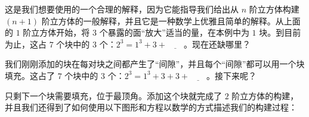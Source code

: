 这是我们想要使用的一个合理的解释，因为它能指导我们给出从 $n$ 阶立方体构建 $(n+1)$ 阶立方体的一般解释，并且它是一种数学上优雅且简单的解释。从上面的 $1$ 阶立方体开始，将 $3$ 个暴露的面``放大''适当的量，在本例中为 $1$ 块。到目前为止，这占 $7$ 个块中的 $3$ 个：$2^3 = 1^3+3+\underline{\qquad}$。现在还缺哪里？

\begin{center}
\end{center}

我们刚刚添加的块在每对块之间都产生了``间隙''，并且每个``间隙''都可以用一个块填充。这占了 $7$ 个块中的 $3$ 个：$2^3 = 1^3+3+3+\underline{\qquad}$。接下来呢？

\begin{center}
\end{center}

只剩下一个块需要填充，位于最顶角。添加这个块就完成了 $2$ 阶立方体的构建，并且我们还得到了如何使用以下图形和方程以数学的方式描述我们的构建过程：

